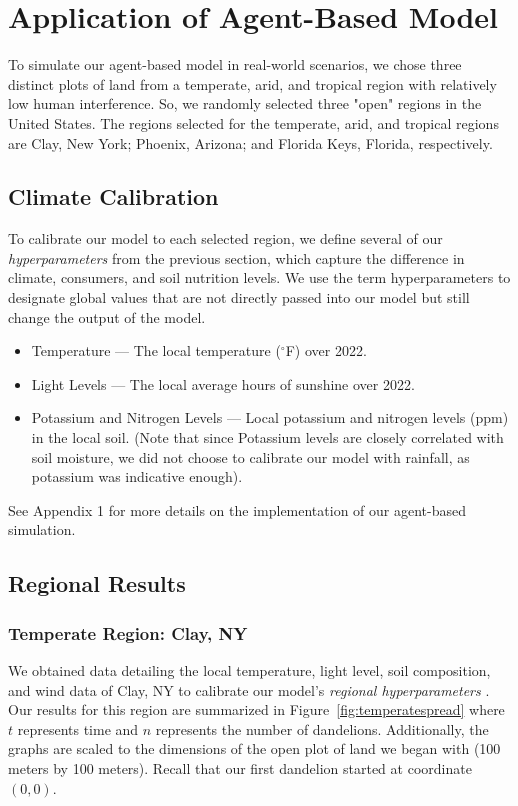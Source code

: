 \section{Application of Agent-Based Model}

To simulate our agent-based model in real-world scenarios, we chose three distinct plots of land from a temperate, arid, and tropical region with relatively low human interference. So, we randomly selected three "open" regions in the United States. The regions selected for the temperate, arid, and tropical regions are Clay, New York; Phoenix, Arizona; and Florida Keys, Florida, respectively. 

\subsection{Climate Calibration}

To calibrate our model to each selected region, we define several of our \textit{hyperparameters} from the previous section, which capture the difference in climate, consumers, and soil nutrition levels. We use the term hyperparameters to designate global values that are not directly passed into our model but still change the output of the model. 

\begin{itemize}
    \item Temperature — The local temperature (\(^\circ\)F) over 2022.
    \item Light Levels — The local average hours of sunshine over 2022.
    \item Potassium and Nitrogen Levels — Local potassium and nitrogen levels (ppm) in the local soil. (Note that since Potassium levels are closely correlated with soil moisture, we did not choose to calibrate our model with rainfall, as potassium was indicative enough).    
\end{itemize}

See Appendix 1 for more details on the implementation of our agent-based simulation. 

\subsection{Regional Results}

\subsubsection{Temperate Region: Clay, NY}
We obtained data detailing the local temperature, light level, soil composition, and wind data of Clay, NY to calibrate our model's \textit{regional hyperparameters} \cite{aladin_wolcott_nodate, us_department_of_commerce_nowdata_nodate}. Our results for this region are summarized in Figure~\ref{fig:temperatespread} where \(t\) represents time and \(n\) represents the number of dandelions. Additionally, the graphs are scaled to the dimensions of the open plot of land we began with (100 meters by 100 meters). Recall that our first dandelion started at coordinate \((0,0)\).

